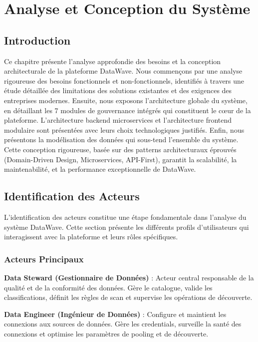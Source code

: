 \chapter{Analyse et Conception du Système}

\section*{Introduction}

Ce chapitre présente l'analyse approfondie des besoins et la conception architecturale de la plateforme DataWave. Nous commençons par une analyse rigoureuse des besoins fonctionnels et non-fonctionnels, identifiés à travers une étude détaillée des limitations des solutions existantes et des exigences des entreprises modernes. Ensuite, nous exposons l'architecture globale du système, en détaillant les 7 modules de gouvernance intégrés qui constituent le cœur de la plateforme. L'architecture backend microservices et l'architecture frontend modulaire sont présentées avec leurs choix technologiques justifiés. Enfin, nous présentons la modélisation des données qui sous-tend l'ensemble du système. Cette conception rigoureuse, basée sur des patterns architecturaux éprouvés (Domain-Driven Design, Microservices, API-First), garantit la scalabilité, la maintenabilité, et la performance exceptionnelle de DataWave.

\section{Identification des Acteurs}

L'identification des acteurs constitue une étape fondamentale dans l'analyse du système DataWave. Cette section présente les différents profils d'utilisateurs qui interagissent avec la plateforme et leurs rôles spécifiques.

\subsection{Acteurs Principaux}

\textbf{Data Steward (Gestionnaire de Données)} : Acteur central responsable de la qualité et de la conformité des données. Gère le catalogue, valide les classifications, définit les règles de scan et supervise les opérations de découverte.

\textbf{Data Engineer (Ingénieur de Données)} : Configure et maintient les connexions aux sources de données. Gère les credentials, surveille la santé des connexions et optimise les paramètres de pooling et de découverte.

